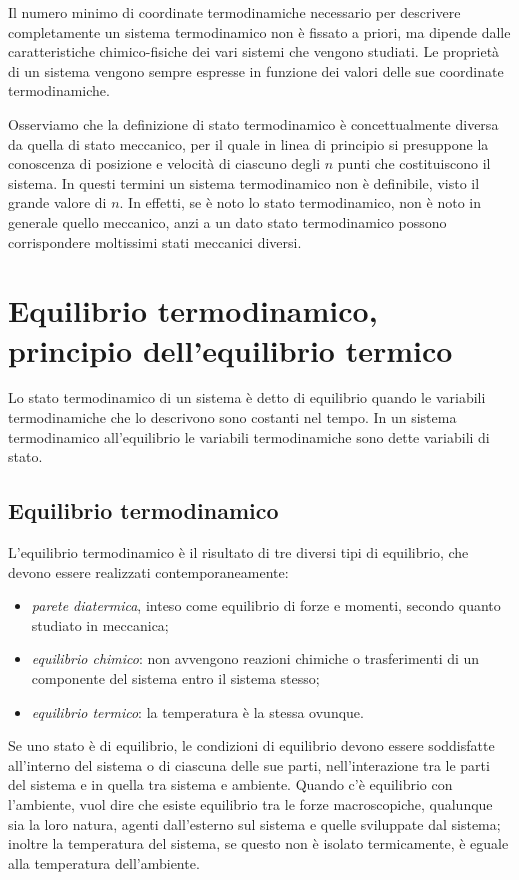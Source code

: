 \documentclass[class=book, crop=false, oneside, 12pt]{standalone}
\begin{document}
Il numero minimo di coordinate termodinamiche necessario per descrivere completamente un sistema termodinamico non è fissato a priori, ma dipende dalle caratteristiche chimico-fisiche dei vari sistemi che vengono studiati. 
Le proprietà di un sistema vengono sempre espresse in funzione dei valori delle sue coordinate termodinamiche. 

Osserviamo che la definizione di stato termodinamico è concettualmente diversa da quella di stato meccanico, per il quale in linea di principio si presuppone la conoscenza di posizione e velocità di ciascuno degli \(n\) punti che costituiscono il sistema. 
In questi termini un sistema termodinamico non è definibile, visto il grande valore di \(n\). 
In effetti, se è noto lo stato termodinamico, non è noto in generale quello meccanico, anzi a un dato stato termodinamico possono corrispondere moltissimi stati meccanici diversi. 

\section{Equilibrio termodinamico, principio dell'equilibrio termico}

Lo stato termodinamico di un sistema è detto di equilibrio quando le variabili termodinamiche che lo descrivono sono costanti nel tempo. 
In un sistema termodinamico all'equilibrio le variabili termodinamiche sono dette variabili di stato.

\subsection{Equilibrio termodinamico}

L'equilibrio termodinamico è il risultato di tre diversi tipi di equilibrio, che devono essere realizzati contemporaneamente:

\begin{itemize}
    \item \emph{parete diatermica}, inteso come equilibrio di forze e momenti, secondo quanto studiato in meccanica; 
    \item \emph{equilibrio chimico}: non avvengono reazioni chimiche o trasferimenti di un componente del sistema entro il sistema stesso; 
    \item \emph{equilibrio termico}: la temperatura è la stessa ovunque.
\end{itemize}

Se uno stato è di equilibrio, le condizioni di equilibrio devono essere soddisfatte all'interno del sistema o di ciascuna delle sue parti, nell'interazione tra le parti del sistema e in quella tra sistema e ambiente. 
Quando c'è equilibrio con l'ambiente, vuol dire che esiste equilibrio tra le forze macroscopiche, qualunque sia la loro natura, agenti dall'esterno sul sistema e quelle sviluppate dal sistema; 
inoltre la temperatura del sistema, se questo non è isolato termicamente, è eguale alla temperatura dell'ambiente. 
\end{document}
